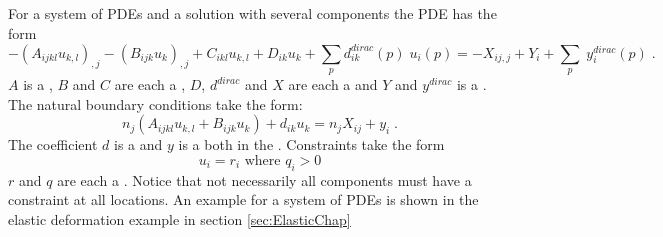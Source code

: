 For a system of PDEs and a solution with several components the PDE has the form
\begin{equation}\label{LINEARPDE.SYSTEM.1}
-(A_{ijkl} u_{k,l})_{,j}-(B_{ijk} u_{k})_{,j}+C_{ikl} u_{k,l}+D_{ik} u_{k}+
 \sum_p d^{dirac}_{ik}(p) \;  u_i(p)
 =-X_{ij,j}+Y_{i} +\sum_p \; y^{dirac}_i(p)   \; .
\end{equation}
$A$ is a \RankFour, $B$ and $C$ are each a \RankThree, $D$, $d^{dirac}$ and $X$ are each a \RankTwo and $Y$ and $y^{dirac}$ is a \RankOne.
The natural boundary conditions take the form:
\begin{equation}\label{LINEARPDE.SYSTEM.2}
n_{j}(A_{ijkl} u_{k,l}+B_{ijk} u_{k})+d_{ik} u_{k}=n_{j}X_{ij}+y_{i}  \;.
\end{equation}
The coefficient $d$ is a \RankTwo and $y$ is a \RankOne both in the
\FunctionOnBoundary. Constraints take the form
\begin{equation}\label{LINEARPDE.SYSTEM.3}
u_{i}=r_{i} \mbox{ where } q_{i}>0
\end{equation}
$r$ and $q$ are each a \RankOne. Notice that not necessarily all components
must have a constraint at all locations.  An example for a system of PDEs is shown in the elastic deformation example in section \ref{sec:ElasticChap}

